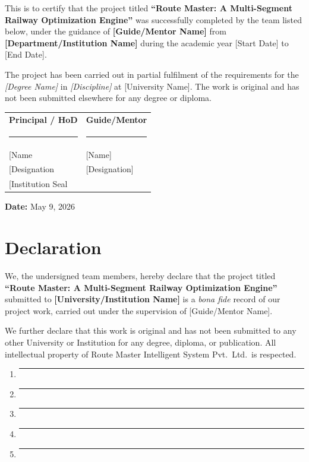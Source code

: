 \documentclass[12pt,a4paper]{report}
\begin{document}
This is to certify that the project titled \textbf{``Route Master: A Multi-Segment Railway Optimization Engine''} was successfully completed by the team listed below, under the guidance of \textbf{[Guide/Mentor Name]} from \textbf{[Department/Institution Name]} during the academic year [Start Date] to [End Date].

The project has been carried out in partial fulfilment of the requirements for the \textit{[Degree Name]} in \textit{[Discipline]} at [University Name]. The work is original and has not been submitted elsewhere for any degree or diploma.

\vspace{2cm}

\begin{tabular}{p{}p{}}
  \textbf{Principal / HoD} & \textbf{Guide/Mentor} \\[1cm]
  \rule{5cm}{0.4pt} & \rule{5cm}{0.4pt} \\
  \relax [Name & [Name] \\
  \relax [Designation & [Designation] \\
  \relax [Institution Seal & \\
\end{tabular}

\vfill
\textbf{Date:} May 9, 2026

\chapter*{Declaration}

We, the undersigned team members, hereby declare that the project titled \textbf{``Route Master: A Multi-Segment Railway Optimization Engine''} submitted to \textbf{[University/Institution Name]} is a \textit{bona fide} record of our project work, carried out under the supervision of [Guide/Mentor Name].

We further declare that this work is original and has not been submitted to any other University or Institution for any degree, diploma, or publication. All intellectual property of Route Master Intelligent System Pvt.\ Ltd.\ is respected.

\vspace{1cm}

\begin{enumerate}
  \item [Team Member 1 Name] \hfill \rule{4cm}{0.4pt}
  \item [Team Member 2 Name] \hfill \rule{4cm}{0.4pt}
  \item [Team Member 3 Name] \hfill \rule{4cm}{0.4pt}
  \item [Team Member 4 Name] \hfill \rule{4cm}{0.4pt}
  \item [Team Member 5 Name] \hfill \rule{4cm}{0.4pt}
\end{enumerate}
\end{document}
